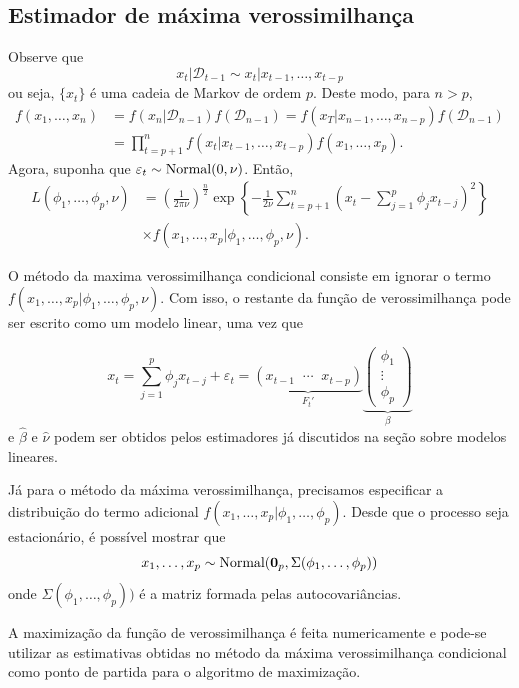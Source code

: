 \documentclass[
  letterpaper,
  DIV=11,
  numbers=noendperiod]{scrartcl}
\theoremstyle{definition}
\theoremstyle{definition}
\theoremstyle{plain}
\theoremstyle{plain}
\theoremstyle{remark}
\begin{document}
\subsection{Estimador de máxima
verossimilhança}\label{estimador-de-muxe1xima-verossimilhanuxe7a}

Observe que \[x_t|\mathcal{D}_{t-1}\sim x_t|x_{t-1},\ldots,x_{t-p}\] ou
seja, \(\{x_t\}\) é uma cadeia de Markov de ordem \(p\). Deste modo,
para \(n>p\), \begin{align*}
f(x_{1},\ldots,x_n)&=f\left(x_n|\mathcal{D}_{n-1}\right)f\left(\mathcal{D}_{n-1}\right)=f\left(x_T|x_{n-1},\ldots,x_{n-p}\right)f\left(\mathcal{D}_{n-1}\right)\\
        &=\prod_{t=p+1}^{n}f\left(x_t|x_{t-1},\ldots,x_{t-p}\right) f(x_{1},\ldots,x_p).
        \end{align*} Agora, suponha que
\(\varepsilon_t\sim\hbox{Normal}(0,\nu)\). Então, \begin{align*}
L(\phi_1,\ldots,\phi_p,\nu)&=\left(\frac{1}{2\pi\nu}\right)^{\frac{n}{2}}\exp\left\{-\frac{1}{2\nu}\sum_{t=p+1}^n(x_t-\sum_{j=1}^p \phi_jx_{t-j})^2\right\}\\&\times f(x_{1},\ldots,x_p|\phi_1,\ldots,\phi_p,\nu).
        \end{align*}

O método da maxima verossimilhança condicional consiste em ignorar o
termo \(f(x_{1},\ldots,x_p|\phi_1,\ldots,\phi_p,\nu)\). Com isso, o
restante da função de verossimilhança pode ser escrito como um modelo
linear, uma vez que

\[x_t=\sum_{j=1}^p \phi_jx_{t-j}+\varepsilon_t=\underbrace{(x_{t-1}\;\;\cdots \;\;x_{t-p})}_{F_t'}\underbrace{\left(\begin{array}{c}\phi_1 \\ \vdots \\ \phi_p\end{array}\right)}_{\beta}\]
e \(\hat{\beta}\) e \(\hat{\nu}\) podem ser obtidos pelos estimadores já
discutidos na seção sobre modelos lineares.

Já para o método da máxima verossimilhança, precisamos especificar a
distribuição do termo adicional
\(f(x_1,\ldots,x_p|\phi_1,\ldots,\phi_p)\). Desde que o processo seja
estacionário, é possível mostrar que
\[x_1,\ldots,x_p\sim\hbox{Normal}(\textbf{0}_p,\Sigma(\phi_1,\ldots,\phi_p))\]
onde \(\Sigma(\phi_1,\ldots,\phi_p))\) é a matriz formada pelas
autocovariâncias.

A maximização da função de verossimilhança é feita numericamente e
pode-se utilizar as estimativas obtidas no método da máxima
verossimilhança condicional como ponto de partida para o algoritmo de
maximização.
\end{document}
